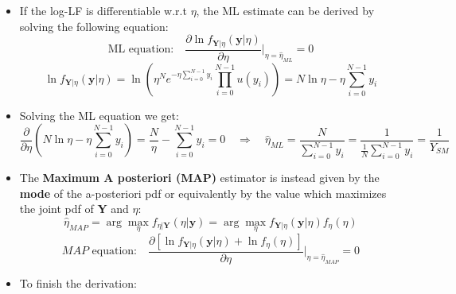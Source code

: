 \begin{itemize}
\[
\hat{\eta}=\underset{\eta}{\arg\max}f_{\mathbf{Y}\mid\eta}(\mathbf{y}\mid\eta)
\]
\item If the log-LF is differentiable w.r.t \(\eta\), the ML estimate can be derived by solving the following equation:
$$
\text{ML equation:} \quad \frac{\partial \ln f_{\mathbf{Y}|\eta}(\mathbf{y}|\eta)}{\partial \eta} \bigg|_{\eta=\hat{\eta}_{ML}} = 0
$$
\vspace{-0.5em}
$$
\ln f_{\mathbf{Y}|\eta}(\mathbf{y}|\eta) = \ln \left( \eta^N e^{-\eta \sum_{i=0}^{N-1} y_i} \prod_{i=0}^{N-1} u(y_i) \right) = N \ln \eta - \eta \sum_{i=0}^{N-1} y_i
$$
\item Solving the ML equation we get:
\[
\frac{\partial}{\partial \eta} \left( N \ln \eta - \eta \sum_{i=0}^{N-1} y_i \right) = \frac{N}{\eta} - \sum_{i=0}^{N-1} y_i = 0 \quad \Rightarrow \quad \hat{\eta}_{ML} = \frac{N}{\sum_{i=0}^{N-1} y_i} = \frac{1}{\frac{1}{N} \sum_{i=0}^{N-1} y_i} = \frac{1}{Y_{SM}}
\]
\item The \textbf{Maximum A posteriori (MAP)} estimator is instead given by the \textbf{mode} of the a-posteriori pdf or equivalently by the value which maximizes the joint pdf of \textbf{Y} and \(\eta\):
$$
\hat{\eta}_{MAP} = \arg \max_{\eta} f_{\eta|\mathbf{Y}}(\eta|\mathbf{y}) = \arg \max_{\eta} f_{\mathbf{Y}|\eta}(\mathbf{y}|\eta) f_\eta(\eta)
$$
\vspace{-0.5em}
$$
MAP \text{ equation:} \quad \frac{\partial \left[ \ln f_{\mathbf{Y}|\eta}(\mathbf{y}|\eta) + \ln f_\eta(\eta) \right]}{\partial \eta} \bigg|_{\eta=\hat{\eta}_{MAP}} = 0
$$
\item To finish the derivation:


\end{itemize}
